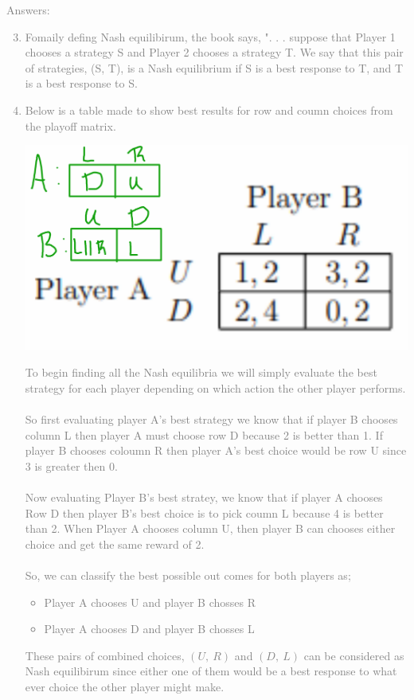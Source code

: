 \documentclass[11pt]{article}
\begin{document}
\textcolor{gray}{
Answers:
\begin{enumerate}
	\setcounter{enumi}{2}
	\item Fomaily defing Nash equilibirum, the book says, ". . . suppose that Player 1 chooses a strategy S and Player 2 chooses a strategy T.  We say that this pair of strategies, (S, T), is a Nash equilibrium if S is a best response to T, and T is a best response to S.  
	\item  Below is a table made to show best results for row and coumn choices from the playoff matrix.\\
	\begin{center}
		\includegraphics[scale=0.3]{Figure1.4}\\
	\end{center}
To begin finding all the Nash equilibria we will simply evaluate the best strategy for each player depending on which action the other player performs.\\\\
	So first evaluating player A's best strategy we know that if player B chooses column L then player A must choose row D because 2 is better than 1. If player B chooses coloumn R then player A's best choice would be row U since 3 is greater then 0.\\\\
 	Now evaluating Player B's best stratey, we know that if player A chooses Row D then player B's best choice is to pick coumn L because 4 is better than 2.  When Player A chooses column U, then player B can chooses either choice and get the same reward of 2.\\\\
So, we can classify the best possible out comes for both players as;\\
\begin{itemize}
	\item Player A chooses U and player B chosses R\\
	\item Player A chooses D and player B chosses L\\
\end{itemize}
These pairs of combined choices, $(U, \ R)$ and $(D, \ L)$ can be considered as Nash equilibirum since either one of them would be a best response to what ever choice the other player might make.
\end{enumerate}
}
\end{document}
